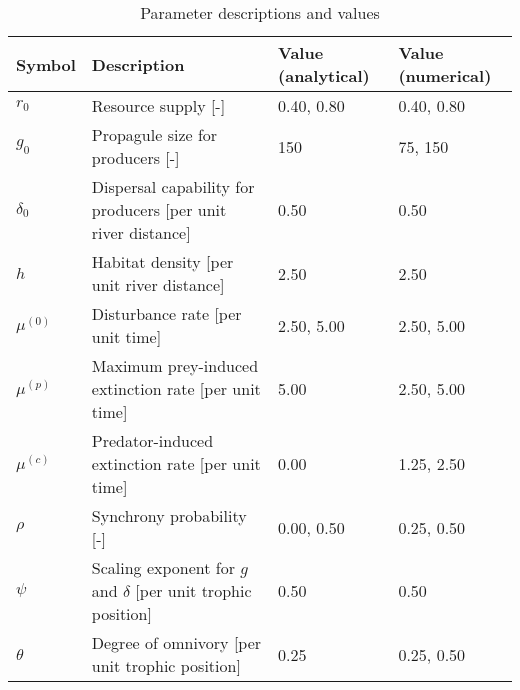 \begin{table}[ht]
\centering
\caption{Parameter descriptions and values\label{tab:parms}} 
\begingroup\small
\begin{tabularx}{\textwidth}{llll}
  \hline
Symbol & Description & Value (analytical) & Value (numerical) \\ 
  \hline
$r_0$ & Resource supply [-] & 0.40, 0.80 & 0.40, 0.80 \\ 
  $g_0$ & Propagule size for producers [-] & 150 & 75, 150 \\ 
  $\delta_0$ & Dispersal capability for producers [per unit river distance] & 0.50 & 0.50 \\ 
  $h$ & Habitat density [per unit river distance] & 2.50 & 2.50 \\ 
  $\mu^{(0)}$ & Disturbance rate [per unit time] & 2.50, 5.00 & 2.50, 5.00 \\ 
  $\mu^{(p)}$ & Maximum prey-induced extinction rate [per unit time] & 5.00 & 2.50, 5.00 \\ 
  $\mu^{(c)}$ & Predator-induced extinction rate [per unit time] & 0.00 & 1.25, 2.50 \\ 
  $\rho$ & Synchrony probability [-] & 0.00, 0.50 & 0.25, 0.50 \\ 
  $\psi$ & Scaling exponent for $g$ and $\delta$ [per unit trophic position] & 0.50 & 0.50 \\ 
  $\theta$ & Degree of omnivory [per unit trophic position] & 0.25 & 0.25, 0.50 \\ 
   \hline
\end{tabularx}
\endgroup
\end{table}
